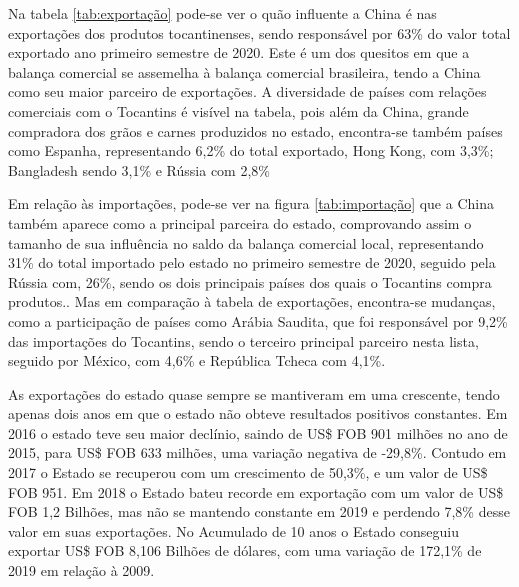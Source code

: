\par Na tabela \ref{tab:exportação} pode-se ver o quão influente a China é nas exportações dos produtos tocantinenses, sendo responsável por 63\% do valor total exportado ano primeiro semestre de 2020. Este é um dos quesitos em que a balança comercial se assemelha à balança comercial brasileira, tendo a China como seu maior parceiro de exportações. 
A diversidade de países com relações comerciais com o Tocantins é visível na tabela, pois além da China, grande compradora dos grãos e carnes produzidos no estado, encontra-se também países como Espanha, representando 6,2\% do total exportado, Hong Kong, com 3,3\%; Bangladesh sendo 3,1\% e Rússia com 2,8\%


\par Em relação às importações, pode-se ver na figura \ref{tab:importação} que a China também aparece como a principal parceira do estado, comprovando assim o tamanho de sua influência no saldo da balança comercial local, representando 31\% do total importado pelo estado no primeiro semestre de 2020, seguido pela Rússia com, 26\%, sendo os dois principais países dos quais o Tocantins compra produtos.. Mas em comparação à tabela de exportações, encontra-se mudanças, como a participação de países como Arábia Saudita, que foi responsável por 9,2\% das importações do Tocantins, sendo o terceiro principal parceiro nesta lista, seguido por México, com 4,6\% e República Tcheca com 4,1\%.




\par As exportações do estado quase sempre se mantiveram em uma crescente, tendo
apenas dois anos em que o estado não obteve resultados positivos constantes. Em 2016 o estado teve seu maior declínio, saindo de US\$ FOB 901 milhões no ano de 2015, para US\$ FOB 633 milhões, uma variação negativa de  -29,8\%. 
Contudo em 2017 o Estado se recuperou com um crescimento de 50,3\%, e um valor de US\$ FOB 951. Em 2018 o Estado bateu recorde em exportação com um valor de US\$ FOB 1,2 Bilhões, mas não se mantendo constante em 2019 e perdendo 7,8\% desse valor em suas exportações.
No Acumulado de 10 anos o Estado conseguiu exportar US\$ FOB 8,106 Bilhões de dólares, com uma variação de 172,1\% de 2019 em relação à 2009.

